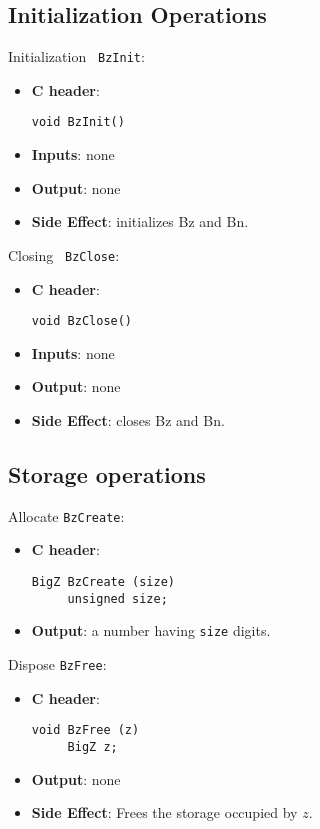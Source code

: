 \subsection{Initialization Operations}

\begin{func} Initialization \verb+ BzInit+:
\begin{itemize}
 \item {\bf C header}: 
\begin{verbatim}
void BzInit()
\end{verbatim}
 \item {\bf Inputs}: none 
 \item {\bf Output}: none
 \item {\bf Side Effect}: initializes Bz and Bn.
\end{itemize}
\end{func}

\begin{func} Closing \verb+ BzClose+:
\begin{itemize}
 \item {\bf C header}: 
\begin{verbatim}
void BzClose()
\end{verbatim}
 \item {\bf Inputs}: none 
 \item {\bf Output}: none
 \item {\bf Side Effect}: closes Bz and Bn.
\end{itemize}
\end{func}

\subsection{Storage operations}

\begin{func} Allocate  \verb+BzCreate+:
\begin{itemize}
  \item{\bf C header}:
\begin{verbatim}
BigZ BzCreate (size)    
     unsigned size;
\end{verbatim}
  \item{\bf Output}: a number having \verb+size+ digits.
\end{itemize}
\end{func}
 
\begin{func} Dispose  \verb+BzFree+:
\begin{itemize}
  \item{\bf C header}:
\begin{verbatim}
void BzFree (z)
     BigZ z;
\end{verbatim}
  \item{\bf Output}: none
  \item{\bf Side Effect}: Frees the storage occupied by $z$.
\end{itemize}
\end{func}
 

